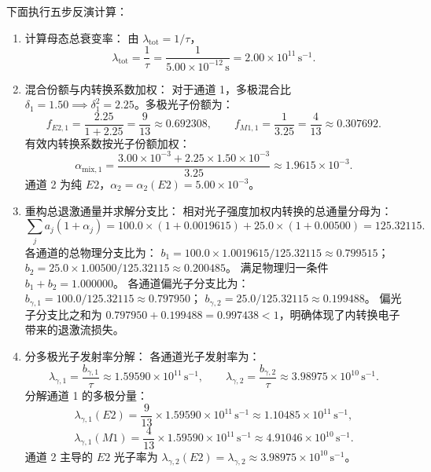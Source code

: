下面执行五步反演计算：
\begin{enumerate}
\item 计算母态总衰变率：
由 $\lambda_{\text{tot}} = 1/\tau$，
\begin{equation}\label{eq:5-9-ped-tot}
\lambda_{\text{tot}} = \frac{1}{\tau} = \frac{1}{5.00 \times 10^{-12}\,\text{s}} = 2.00 \times 10^{11}\,\text{s}^{-1}.
\end{equation}

\item 混合份额与内转换系数加权：
对于通道 1，多极混合比 $\delta_1 = 1.50 \implies \delta_1^2 = 2.25$。多极光子份额为：
\begin{equation}\label{eq:5-9-ped-frac-1}
f_{E2, 1} = \frac{2.25}{1 + 2.25} = \frac{9}{13} \approx 0.692308, \qquad f_{M1, 1} = \frac{1}{3.25} = \frac{4}{13} \approx 0.307692.
\end{equation}
有效内转换系数按光子份额加权：
\begin{equation}\label{eq:5-9-ped-alpha-mix}
\alpha_{\text{mix}, 1} = \frac{3.00 \times 10^{-3} + 2.25 \times 1.50 \times 10^{-3}}{3.25} \approx 1.9615 \times 10^{-3}.
\end{equation}
通道 2 为纯 $E2$，$\alpha_2 = \alpha_2(E2) = 5.00 \times 10^{-3}$。

\item 重构总退激通量并求解分支比：
相对光子强度加权内转换的总通量分母为：
\begin{equation}\label{eq:5-9-ped-flux-sum}
\sum_j a_j (1 + \alpha_j) = 100.0 \times (1 + 0.0019615) + 25.0 \times (1 + 0.00500) = 125.32115.
\end{equation}
各通道的总物理分支比为：
$b_1 = 100.0 \times 1.0019615 / 125.32115 \approx 0.799515$；
$b_2 = 25.0 \times 1.00500 / 125.32115 \approx 0.200485$。
满足物理归一条件 $b_1 + b_2 = 1.000000$。
各通道偏光子分支比为：
$b_{\gamma, 1} = 100.0 / 125.32115 \approx 0.797950$；
$b_{\gamma, 2} = 25.0 / 125.32115 \approx 0.199488$。
偏光子分支比之和为 $0.797950 + 0.199488 = 0.997438 < 1$，明确体现了内转换电子带来的退激流损失。

\item 分多极光子发射率分解：
各通道光子发射率为：
\begin{equation}\label{eq:5-9-ped-lambda-gamma}
\lambda_{\gamma, 1} = \frac{b_{\gamma, 1}}{\tau} \approx 1.59590 \times 10^{11}\,\text{s}^{-1}, \qquad \lambda_{\gamma, 2} = \frac{b_{\gamma, 2}}{\tau} \approx 3.98975 \times 10^{10}\,\text{s}^{-1}.
\end{equation}
分解通道 1 的多极分量：
\begin{equation}\label{eq:5-9-ped-lambda-e2-1}
\lambda_{\gamma, 1}(E2) = \frac{9}{13} \times 1.59590 \times 10^{11}\,\text{s}^{-1} \approx 1.10485 \times 10^{11}\,\text{s}^{-1},
\end{equation}
\begin{equation}\label{eq:5-9-ped-lambda-m1-1}
\lambda_{\gamma, 1}(M1) = \frac{4}{13} \times 1.59590 \times 10^{11}\,\text{s}^{-1} \approx 4.91046 \times 10^{10}\,\text{s}^{-1}.
\end{equation}
通道 2 主导的 $E2$ 光子率为 $\lambda_{\gamma, 2}(E2) = \lambda_{\gamma, 2} \approx 3.98975 \times 10^{10}\,\text{s}^{-1}$。


\end{enumerate}
